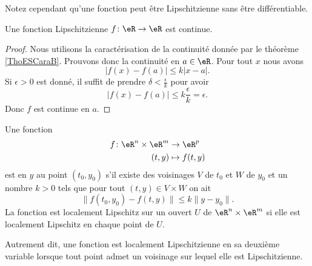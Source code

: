 Notez cependant qu'une fonction peut être Lipschitzienne sans être différentiable.

\begin{proposition} \label{PropFZgFTEW}
    Une fonction Lipschitzienne \( f\colon \eR\to \eR\) est continue.
\end{proposition}

\begin{proof}
    Nous utilisons la caractérisation de la continuité donnée par le théorème \ref{ThoESCaraB}. Prouvons donc la continuité en \( a\in \eR\). Pour tout \( x\) nous avons
    \begin{equation}
        \big| f(x)-f(a) \big|\leq k| x-a |.
    \end{equation}
    Si \( \epsilon>0\) est donné, il suffit de prendre \( \delta<\frac{ \epsilon }{ k }\) pour avoir
    \begin{equation}
        \big| f(x)-f(a) \big|\leq k\frac{ \epsilon }{ k }=\epsilon.
    \end{equation}
    Donc \( f\) est continue en \( a\).
\end{proof}

\begin{definition}      \label{DefJSFFooEOCogV}
    Une fonction 
    \begin{equation}
        \begin{aligned}
            f\colon \eR^n\times \eR^m&\to \eR^p \\
            (t,y)&\mapsto f(t,y) 
        \end{aligned}
    \end{equation}
    est  en \( y\) au point \( (t_0,y_0)\) s'il existe des voisinages \( V\) de \( t_0\) et \( W\) de \( y_0\) et un nombre \( k>0\) tels que pour tout \( (t,y)\in V\times W\) on ait
    \begin{equation}
        \big\| f(t_0,y_0)-f(t,y) \big\|\leq k\| y-y_0 \|.
    \end{equation}
    La fonction est localement Lipschitz sur un ouvert \( U\) de \( \eR^n\times \eR^m\) si elle est localement Lipschitz en chaque point de \( U\).
\end{definition}

\begin{normaltext}      \label{NORMooYNRAooBgobcK}
    Autrement dit, une fonction est localement Lipschitzienne en sa deuxième variable lorsque tout point admet un voisinage sur lequel elle est Lipschitzienne.
\end{normaltext}

